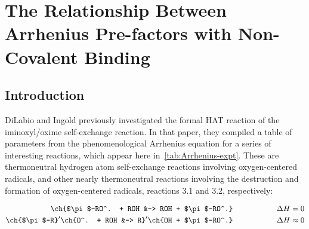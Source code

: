 
\chapter{The Relationship Between Arrhenius Pre-factors with Non-Covalent Binding}
\label{ch:arrhenius}

\section{Introduction}

DiLabio and Ingold\cite{DiLabio2005} previously investigated the formal HAT
reaction of the iminoxyl/oxime self-exchange reaction. In that paper, they
compiled a table of parameters from the phenomenological Arrhenius equation for
a series of interesting reactions, which appear here
in~\ref{tab:Arrhenius-expt}.\cite{Kreilick1966, Mader2004, Mahoney1970,
DaRooge1967, Howard1973, Foti1994, Chenier1974, Chenier1975} These are
thermoneutral hydrogen atom self-exchange reactions involving oxygen-centered
radicals, and other nearly thermoneutral reactions involving the destruction and
formation of oxygen-centered radicals, reactions 3.1 and 3.2, respectively:

\begin{align}
  \ch{$\pi$-RO^. + ROH &-> ROH + $\pi$-RO^.} \hspace{2cm} \Delta H = 0 \\
  \ch{$\pi$-R}^\prime\ch{O^. + ROH &-> R}^\prime\ch{OH + $\pi$-RO^.} \hspace{2cm} \Delta H \approx 0
\end{align}

\newcommand{\tabFig}[2][0.35]{\texttt{[image: figures/\#2.eps]}}

